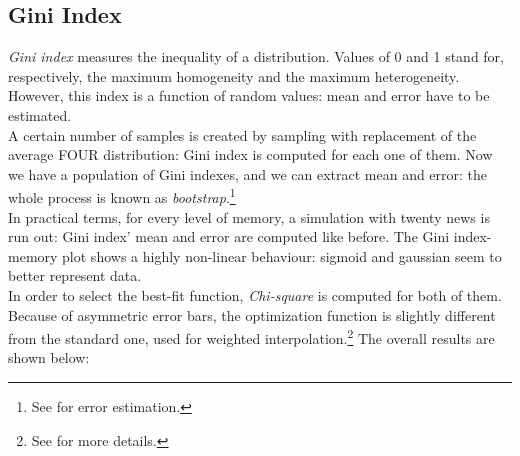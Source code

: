 \subsection{Gini Index}
\textit{Gini index}\cite{ginindex} measures the inequality of a
distribution. Values of 0 and 1 stand for, respectively, the
maximum homogeneity and the maximum heterogeneity.
However, this index is a function of random values: mean and
error have to be estimated.\\
A certain number of samples is created by sampling with replacement
of the average FOUR distribution: Gini index is computed for each
one of them.
Now we have a population of Gini indexes, and we can extract
mean and error: the whole process is known as
\textit{bootstrap}.\footnote{See  for error estimation.}\cite{bootstrap}\\
In practical terms, for every level of  memory, a simulation with
twenty news is run out: Gini index' mean and error are computed
like before.
The Gini index-memory plot shows a highly non-linear behaviour:
sigmoid and gaussian seem to better represent data.\\
In order to select the best-fit function, \textit{Chi-square} is
computed for both of them. \\
Because of asymmetric error bars, the optimization function is
slightly different from the standard one, used for weighted
interpolation.\footnote{See  for more details.}
The overall results are shown below:

